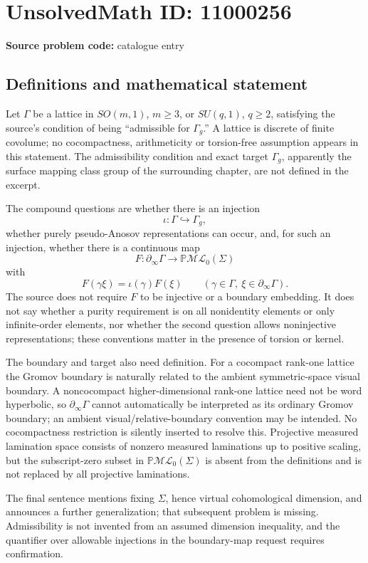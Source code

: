 \documentclass[11pt]{article}
\begin{document}
\section*{UnsolvedMath ID: 11000256}
\textbf{Source problem code:} catalogue entry
\subsection{Definitions and mathematical statement}
Let \(\Gamma\) be a lattice in \(SO(m,1)\), \(m\geq3\), or \(SU(q,1)\), \(q\geq2\), satisfying the source's condition of being ``admissible for \(\Gamma_g\).'' A lattice is discrete of finite covolume; no cocompactness, arithmeticity or torsion-free assumption appears in this statement. The admissibility condition and exact target \(\Gamma_g\), apparently the surface mapping class group of the surrounding chapter, are not defined in the excerpt.

The compound questions are whether there is an injection
\[\iota:\Gamma\hookrightarrow\Gamma_g,\]
whether purely pseudo-Anosov representations can occur, and, for such an injection, whether there is a continuous map
\[F:\partial_\infty\Gamma\longrightarrow\mathbb P\mathcal{ML}_0(\Sigma)\]
with
\[F(\gamma\xi)=\iota(\gamma)F(\xi)\qquad(\gamma\in\Gamma,\ \xi\in\partial_\infty\Gamma).\]
The source does not require \(F\) to be injective or a boundary embedding. It does not say whether a purity requirement is on all nonidentity elements or only infinite-order elements, nor whether the second question allows noninjective representations; these conventions matter in the presence of torsion or kernel.

The boundary and target also need definition. For a cocompact rank-one lattice the Gromov boundary is naturally related to the ambient symmetric-space visual boundary. A noncocompact higher-dimensional rank-one lattice need not be word hyperbolic, so \(\partial_\infty\Gamma\) cannot automatically be interpreted as its ordinary Gromov boundary; an ambient visual/relative-boundary convention may be intended. No cocompactness restriction is silently inserted to resolve this. Projective measured lamination space consists of nonzero measured laminations up to positive scaling, but the subscript-zero subset in \(\mathbb P\mathcal{ML}_0(\Sigma)\) is absent from the definitions and is not replaced by all projective laminations.

The final sentence mentions fixing \(\Sigma\), hence virtual cohomological dimension, and announces a further generalization; that subsequent problem is missing. Admissibility is not invented from an assumed dimension inequality, and the quantifier over allowable injections in the boundary-map request requires confirmation.
\end{document}
